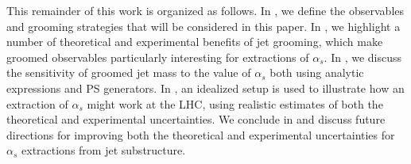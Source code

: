 This remainder of this work is organized as follows.
%
In , we define the observables and grooming strategies that will be considered in this paper.
%
In , we highlight a number of theoretical and experimental benefits of jet grooming, which make groomed observables particularly interesting for extractions of $\alpha_s$.
%
In , we discuss the sensitivity of groomed jet mass to the value of $\alpha_s$ both using analytic expressions and PS generators.
%
In , an idealized setup is used to illustrate how an extraction of $\alpha_s$ might work at the LHC, using realistic estimates of both the theoretical and experimental uncertainties.
%
We conclude in  and discuss future directions for improving both the theoretical and experimental uncertainties for $\alpha_s$ extractions from jet substructure.














\begin{comment}
\begin{itemize}
\item Laying the groundwork for high precision ($\mathcal{O}(1\%)$) extractions of $\alpha_s$ for the full LHC dataset or a future $e^+e^-$ machine.
\item Competitive measurements with existing LHC extractions of $\alpha_s$ (5\%)
\item Probing the tension between thrust (and friends) extractions with lattice (10\%)
\item Parton shower MC (15\%)
\end{itemize}
\end{comment}







